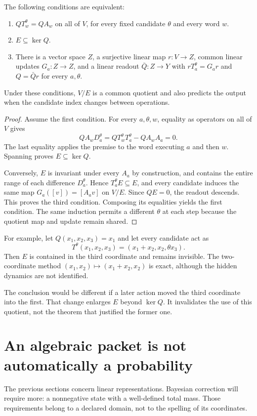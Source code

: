 \begin{Coretheorem}\label{Core:r:common}
The following conditions are equivalent:
\begin{enumerate}
\item $QT_w^\theta=QA_w$ on all of $V$, for every fixed candidate $\theta$ and every word $w$.
\item $E\subseteq\ker Q$.
\item There is a vector space $Z$, a surjective linear map $r:V\to Z$, common linear updates $G_a:Z\to Z$, and a linear readout $\bar Q:Z\to Y$ with $rT_a^\theta=G_ar$ and $Q=\bar Qr$ for every $a,\theta$.
\end{enumerate}
Under these conditions, $V/E$ is a common quotient and also predicts the output when the candidate index changes between operations.
\end{Coretheorem}
\begin{proof}
Assume the first condition. For every $a,\theta,w$, equality as operators on all of $V$ gives
\[
QA_wD_a^\theta=QT_w^\theta T_a^\theta-QA_wA_a=0.
\]
The last equality applies the premise to the word executing $a$ and then $w$. Spanning proves $E\subseteq\ker Q$.

Conversely, $E$ is invariant under every $A_a$ by construction, and contains the entire range of each difference $D_a^\theta$. Hence $T_a^\theta E\subseteq E$, and every candidate induces the same map $G_a([v])=[A_av]$ on $V/E$. Since $QE=0$, the readout descends. This proves the third condition. Composing its equalities yields the first condition. The same induction permits a different $\theta$ at each step because the quotient map and update remain shared.
\end{proof}

For example, let $Q(x_1,x_2,x_3)=x_1$ and let every candidate act as
\[
T^\theta(x_1,x_2,x_3)=(x_1+x_2,x_2,\theta x_3).
\]
Then $E$ is contained in the third coordinate and remains invisible. The two-coordinate method $(x_1,x_2)\mapsto(x_1+x_2,x_2)$ is exact, although the hidden dynamics are not identified.

The conclusion would be different if a later action moved the third coordinate into the first. That change enlarges $E$ beyond $\ker Q$. It invalidates the use of this quotient, not the theorem that justified the former one.


\section{An algebraic packet is not automatically a probability}
The previous sections concern linear representations. Bayesian correction will require more: a nonnegative state with a well-defined total mass. Those requirements belong to a declared domain, not to the spelling of its coordinates.

